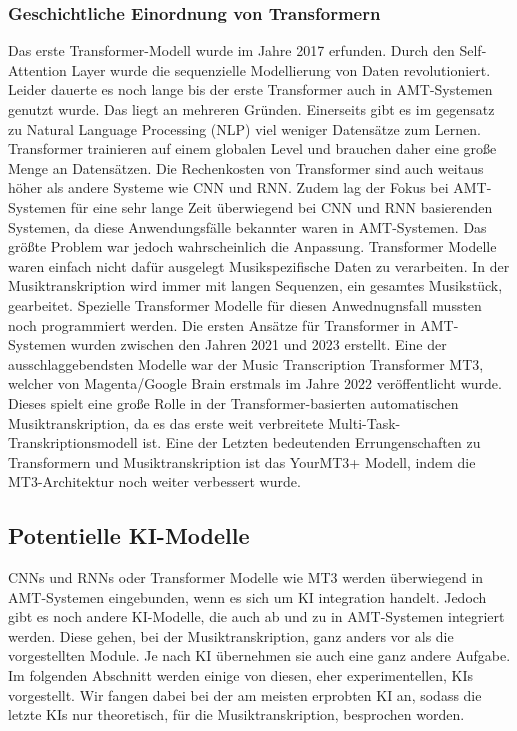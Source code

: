 \subsubsection{Geschichtliche Einordnung von Transformern}
Das erste Transformer-Modell wurde im Jahre 2017 erfunden\cite{vaswani2017attention}.
Durch den Self-Attention Layer wurde die sequenzielle Modellierung von Daten revolutioniert.
Leider dauerte es noch lange bis der erste Transformer auch in AMT-Systemen genutzt wurde.
Das liegt an mehreren Gründen.
Einerseits gibt es im gegensatz zu Natural Language Processing (NLP) viel weniger Datensätze zum Lernen.
Transformer trainieren auf einem globalen Level und brauchen daher eine große Menge an Datensätzen.
Die Rechenkosten von Transformer sind auch weitaus höher als andere Systeme wie CNN und RNN.
Zudem lag der Fokus bei AMT-Systemen für eine sehr lange Zeit überwiegend bei CNN und RNN basierenden Systemen,
da diese Anwendungsfälle bekannter waren in AMT-Systemen.
Das größte Problem war jedoch wahrscheinlich die Anpassung.
Transformer Modelle waren einfach nicht dafür ausgelegt Musikspezifische Daten zu verarbeiten.
In der Musiktranskription wird immer mit langen Sequenzen, ein gesamtes Musikstück, gearbeitet.
Spezielle Transformer Modelle für diesen Anwednugnsfall mussten noch programmiert werden.
Die ersten Ansätze für Transformer in AMT-Systemen wurden zwischen den Jahren 2021 und 2023 erstellt.
Eine der ausschlaggebendsten Modelle war der Music Transcription Transformer MT3,
welcher von Magenta/Google Brain erstmals im Jahre 2022 veröffentlicht wurde\cite{gardner2021mt3}.
Dieses spielt eine große Rolle in der Transformer-basierten automatischen Musiktranskription,
da es das erste weit verbreitete Multi-Task-Transkriptionsmodell ist.
Eine der Letzten bedeutenden Errungenschaften zu Transformern und Musiktranskription ist das
YourMT3+ Modell, indem die MT3-Architektur noch weiter verbessert wurde\cite{chang2024yourmt3}.

\subsection{Potentielle KI-Modelle}
CNNs und RNNs oder Transformer Modelle wie MT3 werden überwiegend in AMT-Systemen eingebunden,
wenn es sich um KI integration handelt.
Jedoch gibt es noch andere KI-Modelle, die auch ab und zu in AMT-Systemen integriert werden.
Diese gehen, bei der Musiktranskription, ganz anders vor als die vorgestellten Module.
Je nach KI übernehmen sie auch eine ganz andere Aufgabe.
Im folgenden Abschnitt werden einige von diesen, eher experimentellen, KIs vorgestellt.
Wir fangen dabei bei der am meisten erprobten KI an,
sodass die letzte KIs nur theoretisch, für die Musiktranskription, besprochen worden.

